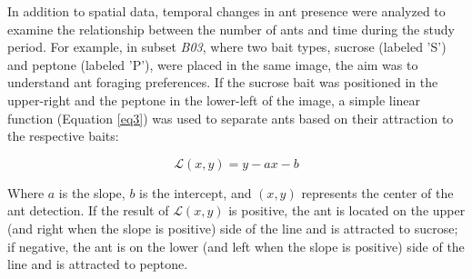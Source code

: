 In addition to spatial data, temporal changes in ant presence were analyzed to examine the relationship between the number of ants and time during the study period. For example, in subset \textit{B03}, where two bait types, sucrose (labeled 'S') and peptone (labeled 'P'), were placed in the same image, the aim was to understand ant foraging preferences. If the sucrose bait was positioned in the upper-right and the peptone in the lower-left of the image, a simple linear function (Equation \ref{eq3}) was used to separate ants based on their attraction to the respective baits:

\begin{equation}
\mathcal{L}(x, y) = y - a x - b
\label{eq3}
\end{equation}

Where $a$ is the slope, $b$ is the intercept, and $(x, y)$ represents the center of the ant detection. If the result of $\mathcal{L}(x, y)$ is positive, the ant is located on the upper (and right when the slope is positive) side of the line and is attracted to sucrose; if negative, the ant is on the lower (and left when the slope is positive) side of the line and is attracted to peptone.

